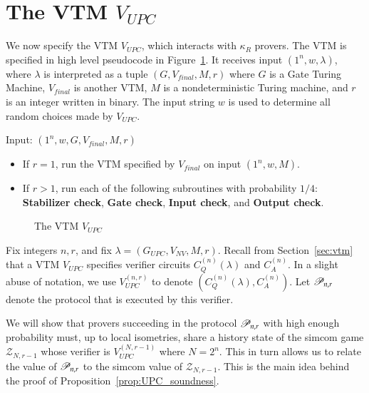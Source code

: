 
\section{The VTM $V_{UPC}$}
\label{sec:vtm_upc}

We now specify the VTM $V_{UPC}$, which interacts with $\kappa_R$ provers. The VTM is specified in high level pseudocode in Figure~\ref{fig:vtm}. It receives input $(1^n,w,\lambda)$, where $\lambda$ is interpreted as a tuple $(G,V_{final},M,r)$ where $G$ is a Gate Turing Machine, $V_{final}$ is another VTM, $M$ is a nondeterministic Turing machine, and $r$ is an integer written in binary. The input string $w$ is used to determine all random choices made by $V_{UPC}$.

\begin{center}
\begin{mdframed}
    Input: $(1^n,w,G,V_{final},M,r)$
    \begin{itemize}
    	\item If $r = 1$, run the VTM specified by $V_{final}$ on input $(1^n,w,M)$.
	
		\item If $r > 1$, run each of the following subroutines with probability $1/4$: \textbf{Stabilizer check}, \textbf{Gate check}, \textbf{Input check}, and \textbf{Output check}.
		\end{itemize}
\end{mdframed}

\begin{figure}[H]
\caption{The VTM $V_{UPC}$}
\label{fig:vtm}
\end{figure}
\end{center}

Fix integers $n, r$, and fix $\lambda = (G_{UPC},V_{NV},M,r)$. Recall from Section~\ref{sec:vtm} that a VTM $V_{UPC}$ specifies verifier circuits $C_Q^{(n)}(\lambda)$ and $C_A^{(n)}$. In a slight abuse of notation, we use $V_{UPC}^{(n,r)}$ to denote $(C_Q^{(n)}(\lambda),C_A^{(n)})$. Let $\mathscr{P}_{n,r}$ denote the protocol that is executed by this verifier. 

We will show that provers succeeding in the protocol $\mathscr{P}_{n,r}$ with high enough probability must, up to local isometries, share a history state of the simcom game $\mathscr{Z}_{N,r-1}$ whose verifier is $V_{UPC}^{(N,r-1)}$ where $N = 2^n$. This in turn allows us to relate the value of $\mathscr{P}_{n,r}$ to the simcom value of $\mathscr{Z}_{N,r-1}$. This is the main idea behind the proof of Proposition~\ref{prop:UPC_soundness}.


